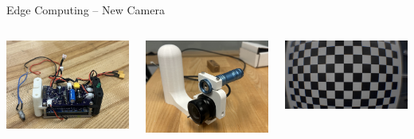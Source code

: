 \begin{frame}{Edge Computing – New Camera}
    \begin{columns}[c]
        \centering
        \includegraphics[width=\linewidth]{images/IMG_4633.jpeg}
        
        \centering
        \includegraphics[width=\linewidth]{images/IMG_4635.jpeg}
        
        \centering
        \includegraphics[width=\linewidth]{images/close_exploreHD_screenshot_14.07.2025.png}
    \end{columns}
\end{frame}


